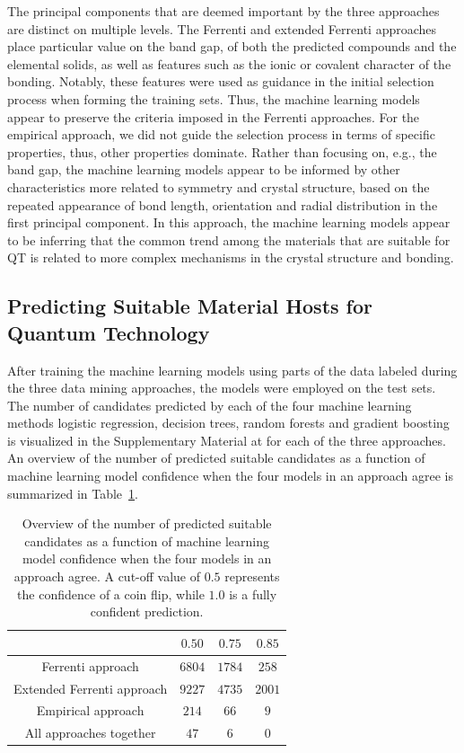 \documentclass[superscriptaddress,unsortedaddress,
 amsmath,amssymb,
 aps,
]{revtex4-2}
\begin{document}
The principal components that are deemed important by the three approaches are distinct on multiple levels. The Ferrenti and extended Ferrenti approaches place particular value on the band gap, of both the predicted compounds and the elemental solids, as well as features such as the ionic or covalent character of the bonding. Notably, these features were used as guidance in the initial selection process when forming the training sets. Thus, the machine learning models appear to preserve the criteria imposed in the Ferrenti approaches. For the empirical approach, we did not guide the selection process in terms of specific properties, thus, other properties dominate. Rather than focusing on, e.g., the band gap, the machine learning models appear to be informed by other characteristics more related to symmetry and crystal structure, based on the repeated appearance of bond length, orientation and radial distribution in the first principal component. In this approach, the machine learning models appear to be inferring that the common trend among the materials that are suitable for QT is related to more complex mechanisms in the crystal structure and bonding. 

\subsection*{Predicting Suitable Material Hosts for Quantum Technology} 
After training the machine learning models using parts of the data labeled during the three data mining approaches, the models were employed on the test sets. 
The number of candidates predicted by each of the four machine learning methods logistic regression, decision trees, random forests and gradient boosting is visualized in the Supplementary Material at \cite{supplementary} for each of the three approaches. 
An overview of the number of predicted suitable candidates as a function of machine learning model confidence when the four models in an approach agree is summarized in Table~\ref{tab:probabilites}. 

\begin{table}[t]
    \centering 
    \caption{Overview of the number of predicted suitable candidates as a function of machine learning model confidence when the four models in an approach agree. A cut-off value of $0.5$ represents the confidence of a coin flip, while $1.0$ is a fully confident prediction.}
    \begin{tabular}{c|c|c|c}
      & $0.50$ & $0.75$ & $0.85$ \\
     \hline
     Ferrenti approach &  $6804$ & $1784$ & $258$  \\
     Extended Ferrenti approach &  $9227$ & $4735$  & $2001$  \\ 
     Empirical approach & $214$ & $66$ & $9$ \\
     \hline
     All approaches together & $47$ & $6$ & 0 \\
    \end{tabular}
    \label{tab:probabilites}
\end{table} 
\end{document}
